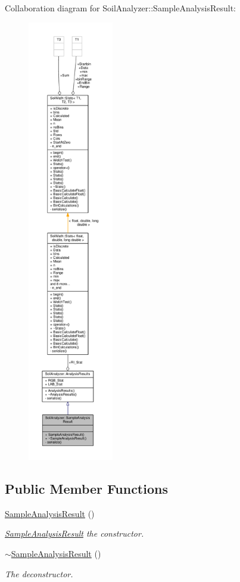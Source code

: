 Collaboration diagram for Soil\+Analyzer\+:\+:Sample\+Analysis\+Result\+:\nopagebreak
\begin{figure}[H]
\begin{center}
\leavevmode
\includegraphics[height=550pt]{class_soil_analyzer_1_1_sample_analysis_result__coll__graph}
\end{center}
\end{figure}
\subsection*{Public Member Functions}
\begin{DoxyCompactItemize}
\item 
\hyperlink{class_soil_analyzer_1_1_sample_analysis_result_acc4ed05ba31712e12c498c2f52a518ab}{Sample\+Analysis\+Result} ()
\begin{DoxyCompactList}\small\item\em \hyperlink{class_soil_analyzer_1_1_sample_analysis_result}{Sample\+Analysis\+Result} the constructor. \end{DoxyCompactList}\item 
\hyperlink{class_soil_analyzer_1_1_sample_analysis_result_a84231772d093a0189ca29d0f07ae7d20}{$\sim$\+Sample\+Analysis\+Result} ()
\begin{DoxyCompactList}\small\item\em The deconstructor. \end{DoxyCompactList}\end{DoxyCompactItemize}
